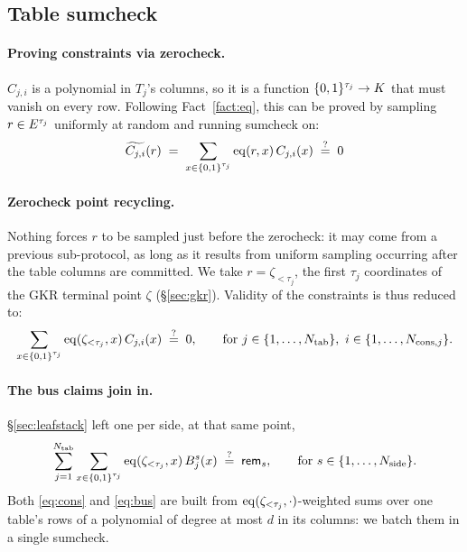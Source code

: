 \subsection{Table sumcheck}\label{sec:air}

\paragraph{Proving constraints via zerocheck.} $C_{j,i}$ is a polynomial in $T_j$'s columns, so it is a function $\{0,1\}^{\tau_j}\to K$ that must vanish on every row. Following Fact~\ref{fact:eq}, this can be proved by sampling $r\in E^{\tau_j}$ uniformly at random and running sumcheck on:
\[
  \widetilde{C_{j,i}}(r)\;=\;\sum_{x\in\{0,1\}^{\tau_j}}\operatorname{eq}(r,x)\,C_{j,i}(x)\;\stackrel{?}{=}\;0
\]

\paragraph{Zerocheck point recycling.} Nothing forces $r$ to be sampled just before the zerocheck: it may come from a previous sub-protocol, as long as it results from uniform sampling occurring after the table columns are committed. We take $r=\zeta_{<\tau_j}$, the first $\tau_j$ coordinates of the GKR terminal point $\zeta$ (\S\ref{sec:gkr}). Validity of the constraints is thus reduced to:
\begin{equation}\label{eq:cons}
  \sum_{x\in\cube{\tau_j}}\eq(\zeta_{<\tau_j},x)\,C_{j,i}(x)\;\qeq\;0,
  \qquad \text{for } j\in\{1,\dots,\ntab\},\ i\in\{1,\dots,\ncons{j}\}.
\end{equation}

\paragraph{The bus claims join in.} \S\ref{sec:leafstack} left one per side, at that same point,
\begin{equation}\label{eq:bus}
  \sum_{j=1}^{N_{\mathrm{tab}}}\sum_{x\in\{0,1\}^{\tau_j}}\operatorname{eq}(\zeta_{<\tau_j},x)\,B^{s}_j(x)\;\stackrel{?}{=}\;\mathsf{rem}_{s},
  \qquad \text{for } s\in\{1,\dots,N_{\mathrm{side}}\}.
\end{equation}
Both \eqref{eq:cons} and \eqref{eq:bus} are built from $\operatorname{eq}(\zeta_{<\tau_j},\cdot)$-weighted sums over one table's rows of a polynomial of degree at most $d$ in its columns: we batch them in a single sumcheck.

